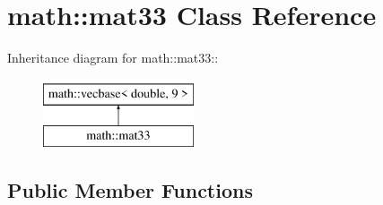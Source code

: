 \hypertarget{classmath_1_1mat33}{
\section{math::mat33 Class Reference}
\label{classmath_1_1mat33}
}
Inheritance diagram for math::mat33::\begin{figure}[H]
\begin{center}
\leavevmode
\includegraphics[height=2cm]{classmath_1_1mat33}
\end{center}
\end{figure}
\subsection*{Public Member Functions}
